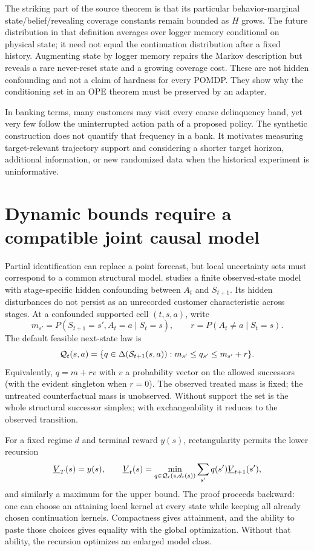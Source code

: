 The striking part of the source theorem is that its particular
behavior-marginal state/belief/revealing coverage constants remain
bounded as $H$ grows. The future distribution in that definition averages
over logger memory conditional on physical state; it need not equal
the continuation distribution after a fixed history. Augmenting state
by logger memory repairs the Markov description but reveals a rare
never-reset state and a growing coverage cost. These are not hidden
confounding and not a claim of hardness for every POMDP. They show why
the conditioning set in an OPE theorem must be preserved by an adapter.

In banking terms, many customers may visit every coarse delinquency band,
yet very few follow the uninterrupted action path of a proposed policy.
The synthetic construction does not quantify that frequency in a bank.
It motivates measuring target-relevant trajectory support and considering
a shorter target horizon, additional information, or new randomized data
when the historical experiment is uninformative.

\section{Dynamic bounds require a compatible joint causal model}
\label{r3:dynamic-bounds}

Partial identification can replace a point forecast, but local uncertainty
sets must correspond to a common structural model.
\citet[Sections 2--4]{sharpdynamic2026} studies a finite observed-state
model with stage-specific hidden confounding between $A_t$ and $S_{t+1}$.
Its hidden disturbances do not persist as an unrecorded customer
characteristic across stages. At a confounded supported cell $(t,s,a)$,
write
\[
 m_{s'}=P(S_{t+1}=s',A_t=a\mid S_t=s),\qquad
 r=P(A_t\ne a\mid S_t=s).
\]
The default feasible next-state law is
\[
 {\cal Q}_t(s,a)=
 \{q\in\Delta({\cal S}_{t+1}(s,a)):m_{s'}\leq q_{s'}
                                  \leq m_{s'}+r\}.
\]
Equivalently, $q=m+r v$ with $v$ a probability vector on the allowed
successors (with the evident singleton when $r=0$). The observed
treated mass is fixed; the untreated counterfactual mass is unobserved.
Without support the set is the whole structural successor simplex;
with exchangeability it reduces to the observed transition.

For a fixed regime $d$ and terminal reward $y(s)$, rectangularity permits
the lower recursion
\[
 \underline V_T(s)=y(s),\qquad
 \underline V_t(s)=\min_{q\in{\cal Q}_t(s,d_t(s))}
                           \sum_{s'}q(s')\underline V_{t+1}(s'),
\]
and similarly a maximum for the upper bound. The proof proceeds backward:
one can choose an attaining local kernel at every state while keeping
all already chosen continuation kernels. Compactness gives attainment,
and the ability to paste those choices gives equality with the global
optimization. Without that ability, the recursion optimizes an enlarged
model class.

